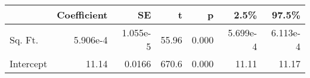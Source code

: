 \begin{tabular}{lrrrrrr}
\toprule
{} &  Coefficient &       SE &     t &     p &     2.5\% &    97.5\% \\
\midrule
Sq. Ft.   &     5.906e-4 & 1.055e-5 & 55.96 & 0.000 & 5.699e-4 & 6.113e-4 \\
Intercept &        11.14 &   0.0166 & 670.6 & 0.000 &    11.11 &    11.17 \\
\bottomrule
\end{tabular}
